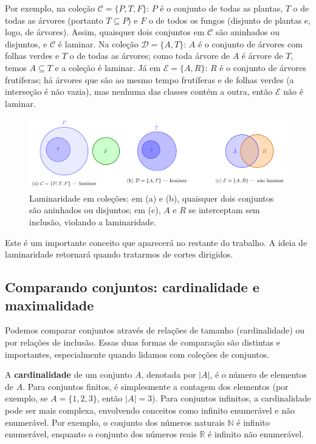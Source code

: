 Por exemplo, na coleção \(\mathcal{C} = \{P, T, F\}\): \(P\) é o conjunto de todas as plantas, \(T\) o de todas as árvores (portanto \(T\subseteq P\)) e \(F\) o de todos os fungos (disjunto de plantas e, logo, de árvores). Assim, quaisquer dois conjuntos em \(\mathcal{C}\) são aninhados ou disjuntos, e \(\mathcal{C}\) é laminar. Na coleção \(\mathcal{D} = \{A, T\}\): \(A\) é o conjunto de árvores com folhas verdes e \(T\) o de todas as árvores; como toda árvore de \(A\) é árvore de \(T\), temos \(A\subseteq T\) e a coleção é laminar. Já em \(\mathcal{E} = \{A, R\}\): \(R\) é o conjunto de árvores frutíferas; há árvores que são ao mesmo tempo frutíferas e de folhas verdes (a interseção é não vazia), mas nenhuma das classes contém a outra, então \(\mathcal{E}\) não é laminar.


\begin{figure}[H]
	\centering
	\includegraphics[width=0.9\linewidth]{figures/fig_laminaridade.pdf}

	\caption{Laminaridade em coleções: em (a) e (b), quaisquer dois conjuntos são aninhados ou disjuntos; em (c), $A$ e $R$ se interceptam sem inclusão, violando a laminaridade.}
	\label{fig:laminaridade}\end{figure}



Este é um importante conceito que aparecerá no restante do trabalho. A ideia de laminaridade retornará quando tratarmos de cortes dirigidos.

\subsection{Comparando conjuntos: cardinalidade e maximalidade}


Podemos comparar conjuntos através de relações de tamanho (cardinalidade) ou por relações de inclusão. Essas duas formas de comparação são distintas e importantes, especialmente quando lidamos com coleções de conjuntos.


A \textbf{cardinalidade} de um conjunto \(A\), denotada por \(|A|\), é o número de elementos de \(A\). Para conjuntos finitos, é simplesmente a contagem dos elementos (por exemplo, se \(A=\{1,2,3\}\), então \(|A|=3\)). Para conjuntos infinitos, a cardinalidade pode ser mais complexa, envolvendo conceitos como infinito enumerável e não enumerável. Por exemplo, o conjunto dos números naturais \(\mathbb{N}\) é infinito enumerável, enquanto o conjunto dos números reais \(\mathbb{R}\) é infinito não enumerável.


